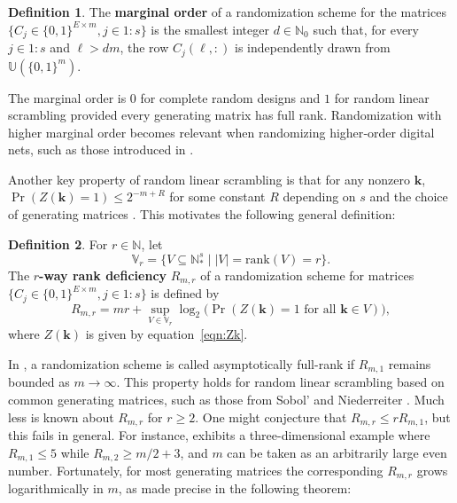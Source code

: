 \documentclass{article}
\theoremstyle{definition}
\newtheorem{definition}{Definition}
\renewcommand{\leq}{\leqslant}
\renewcommand{\geq}{\geqslant}
\newcommand{\natu}{\mathbb{N}}
\newcommand{\bsk}{\boldsymbol{k}}
\newcommand{\dunif}{\mathbb{U}}
\newcommand{\rank}{\mathrm{rank}}
\begin{document}
\begin{definition}
    The \textbf{marginal order} of a randomization scheme for the matrices $\{C_j\in \{0,1\}^{E\times m}, j\in 1{:}s\}$ is the smallest integer $d\in \natu_0$ such that, for every $j\in 1{:}s$ and $\ell>d m$, the row $C_j(\ell,:)$ is independently drawn from $\dunif(\{0,1\}^m)$.
\end{definition}

The marginal order is $0$ for complete random designs and $1$ for random linear scrambling provided every generating matrix has full rank. Randomization with higher marginal order becomes relevant when randomizing higher‑order digital nets, such as those introduced in \cite{dick:2011}.

Another key property of random linear scrambling is that for any nonzero $\bsk$, $\Pr(Z(\bsk)=1)\leq 2^{-m+R}$ for some constant $R$ depending on $s$ and the choice of generating matrices \cite[Corollary 1]{superpolymulti}. This motivates the following general definition:

\begin{definition}
For $r\in\natu$, let
$$\mathbb{V}_r=\{V\subseteq \natu^s_*\mid |V|=\rank(V)=r\}.$$
The \textbf{$r$-way rank deficiency} $R_{m,r}$ of a randomization scheme for matrices $\{C_j\in \{0,1\}^{E\times m}, j\in 1{:}s\}$ is defined by
\begin{equation}\label{eqn:Rmr}
   R_{m,r}=mr+\sup_{V\in \mathbb{V}_r}\log_2\Big(\Pr(Z(\bsk)=1 \text{ for all }\bsk\in V)\Big), 
\end{equation}
   where $Z(\bsk)$ is given by equation~\eqref{eqn:Zk}.
\end{definition}

In \cite{pan2024automatic}, a randomization scheme is called asymptotically full-rank if $R_{m,1}$ remains bounded as $m\to\infty$. This property holds for random linear scrambling based on common generating matrices, such as those from Sobol' \cite{sobol67} and Niederreiter \cite{NIEDERREITER198851}. Much less is known about $R_{m,r}$ for $r\geq 2$. One might conjecture that $R_{m,r}\leq r R_{m,1}$, but this fails in general. For instance, \cite[Section 5]{pan2024skewnessrandomizedquasimontecarlo} exhibits a three-dimensional example where $R_{m,1}\leq 5$ while $R_{m,2}\geq m/2 +3$, and $m$ can be taken as an arbitrarily large even number. Fortunately, for most generating matrices the corresponding $R_{m,r}$ grows logarithmically in $m$, as made precise in the following theorem:
\end{document}
